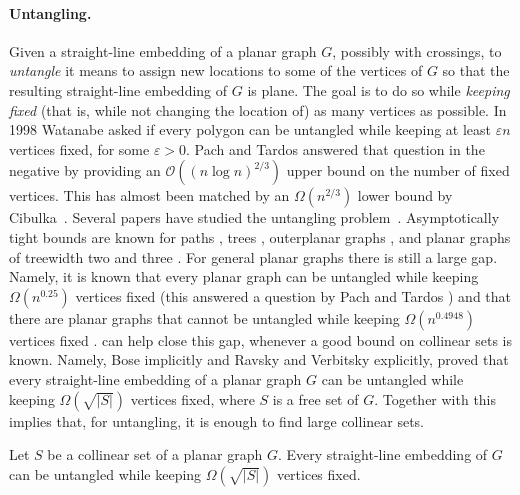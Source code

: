 \paragraph{Untangling.}  Given a straight-line embedding of a planar
graph $G$, possibly with crossings, to \emph{untangle} it means to assign
new locations to some of the vertices of $G$ so that the resulting
straight-line embedding of $G$ is plane. The goal is to do so while
\emph{keeping fixed} (that is, while not changing the location of) as many vertices as possible. In 1998 Watanabe asked if every polygon can be untangled while keeping at least $\varepsilon n$ vertices
fixed, for some $\varepsilon >0$. Pach and Tardos\cite{pt-up-02} answered that question in
the negative by providing an $\mathcal{O}((n\log n)^{2/3})$ upper bound on the
number of fixed vertices. This has almost been  matched by
an 
$\Omega(n^{2/3})$ lower bound by Cibulka~\cite{c-upg-10}. Several papers have studied the untangling
problem~\cite{pt-up-02,cano.toth.ea:upper,c-upg-10,bose.dujmovic.ea:polynomial,gkossw-upg-09, kpr-upg-11,ravsky.verbitsky:on}. Asymptotically tight
bounds are known for paths \cite{c-upg-10}, trees \cite{gkossw-upg-09}, outerplanar graphs
\cite{gkossw-upg-09}, and planar graphs of treewidth two and three \cite{ravsky.verbitsky:on,
  dalozzo.dujmovic.ea:drawing}. For general
planar graphs there is still a large gap. Namely, it is known that every planar graph can be untangled while
keeping $\Omega(n^{0.25})$ vertices fixed
\cite{bose.dujmovic.ea:polynomial} (this answered a 
question by Pach and Tardos \cite{pt-up-02})  and that there are planar graphs
that cannot be untangled while keeping $\Omega(n^{0.4948})$ vertices
fixed \cite{cano.toth.ea:upper}.  can help close this gap, whenever a good bound
on collinear sets is known.  %
Namely, Bose \etal\cite{bose.dujmovic.ea:polynomial} implicitly and  Ravsky and Verbitsky
\cite{ravsky.verbitsky:on} explicitly, proved that every straight-line
embedding of a planar graph $G$ can be untangled while keeping
$\Omega(\sqrt{|S|})$ vertices fixed, where $S$ is a free set of
$G$. Together with  this implies that, for untangling, it is enough to
find large collinear sets.

\begin{thm}
Let $S$ be a collinear set of a planar graph $G$. Every straight-line embedding of $G$ can be untangled while keeping $\Omega(\sqrt{|S|})$ vertices fixed.
\end{thm}


